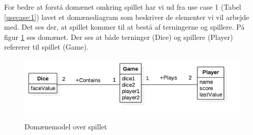For bedre at forstå domænet omkring spillet har vi ud fra use case 1 (Tabel \ref{usecase:1}) lavet et domænediagram som beskriver de elementer vi vil arbejde med.
Det ses der, at spillet kommer til at bestå af terningerne og spillere.
På figur \ref{fig:domaenemodel} ses domænet.
Der ses at både terninger (Dice) og spillere (Player) refererer til spillet (Game).

\begin{figure}[h]
    \begin{center}
        \includegraphics[width=15cm]{graphics/Domaenemodel}
        \caption{Domænemodel over spillet}
        \label{fig:domaenemodel}
    \end{center}
\end{figure}